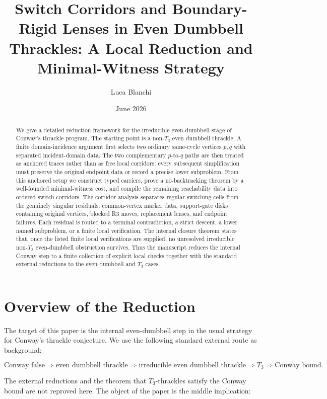 \documentclass[11pt]{amsart}
\title[Switch Corridors: Local Reduction]{Switch Corridors and Boundary-Rigid Lenses in Even Dumbbell Thrackles: A Local Reduction and Minimal-Witness Strategy}
\author{Luca Blanchi}
\date{June 2026}
\theoremstyle{definition}
\begin{document}
\begin{abstract}
We give a detailed reduction framework for the irreducible even-dumbbell stage of Conway's thrackle program. The starting point is a non-\(T_3\) even dumbbell thrackle. A finite domain-incidence argument first selects two ordinary same-cycle vertices \(p,q\) with separated incident-domain data. The two complementary \(p\)-to-\(q\) paths are then treated as anchored traces rather than as free local corridors: every subsequent simplification must preserve the original endpoint data or record a precise lower subproblem. From this anchored setup we construct typed carriers, prove a no-backtracking theorem by a well-founded minimal-witness cost, and compile the remaining reachability data into ordered switch corridors. The corridor analysis separates regular switching cells from the genuinely singular residuals: common-vertex marker data, support-gate disks containing original vertices, blocked R3 moves, replacement lenses, and endpoint failures. Each residual is routed to a terminal contradiction, a strict descent, a lower named subproblem, or a finite local verification. The internal closure theorem states that, once the listed finite local verifications are supplied, no unresolved irreducible non-\(T_3\) even-dumbbell obstruction survives. Thus the manuscript reduces the internal Conway step to a finite collection of explicit local checks together with the standard external reductions to the even-dumbbell and \(T_3\) cases.
\end{abstract}

\maketitle

\tableofcontents

\section{Overview of the Reduction}

The target of this paper is the internal even-dumbbell step in the usual
strategy for Conway's thrackle conjecture. We use the following standard
external route as background:

\[
\text{Conway false}
\Rightarrow
\text{even dumbbell thrackle}
\Rightarrow
\text{irreducible even dumbbell thrackle}
\Rightarrow
T_3
\Rightarrow
\text{Conway bound}.
\]

The external reductions and the theorem that \(T_3\)-thrackles satisfy the Conway
bound are not reproved here. The object of the paper is the middle implication:
\end{document}
